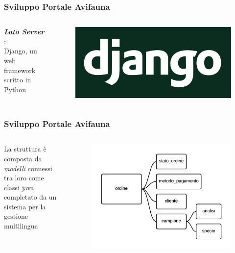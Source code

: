 \documentclass{beamer}
\def \sv {Sviluppo Portale Avifauna}
\begin{document}
\begin{frame}
 \frametitle{\sv}
 \begin{center}
  \begin{columns}
   \begin{center}
    \textbf{\emph{Lato Server}} : \\[0.5cm]
    Django, un web framework scritto in Python
   \end{center}
   \begin{figure}
     \includegraphics[scale=0.08]{images/django}
   \end{figure}
  \end{columns}
 \end{center}
\end{frame}

\begin{frame}
 \frametitle{\sv}
 \begin{center}
  \begin{columns}
   \begin{center}
	 La struttura è composta da \emph{modelli} connessi tra loro come classi java \\[0.5cm]
	 completato da un sistema per la gestione multilingua
   \end{center}
   \begin{figure}
     \includegraphics[scale=0.65]{images/modelli}
   \end{figure}
  \end{columns}
 \end{center}
\end{frame}
\end{document}
